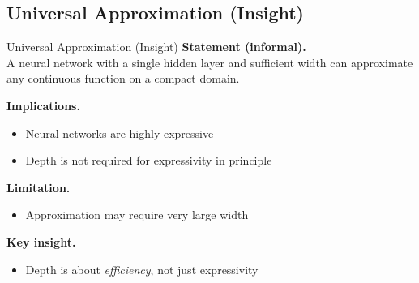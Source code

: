 \documentclass[aspectratio=169,11pt]{beamer}
\begin{document}
\subsection{Universal Approximation (Insight)}
\begin{frame}[t,allowframebreaks]{Universal Approximation (Insight)}
\small
\textbf{Statement (informal).}\\ A neural network with a single hidden layer and sufficient width can approximate any continuous function on a compact domain.

\textbf{Implications.}\\ \begin{itemize}
    \item Neural networks are highly expressive
    \item Depth is not required for expressivity in principle
\end{itemize}

\textbf{Limitation.}\\ \begin{itemize}
    \item Approximation may require very large width
\end{itemize}

\textbf{Key insight.}\\ \begin{itemize}
    \item Depth is about \emph{efficiency}, not just expressivity
\end{itemize}
\end{frame}
\end{document}
